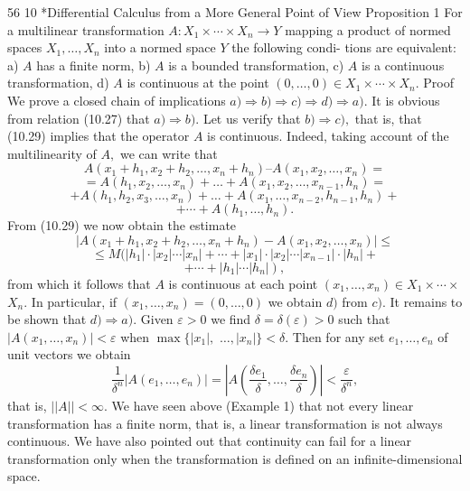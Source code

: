 56
10 *Differential Calculus from a More General Point of View
Proposition 1 For a multilinear transformation $A : X_1 \times \cdots \times X_n \to Y$ mapping a
product of normed spaces $X_1, \ldots, X_n$ into a normed space $Y$ the following condi-
tions are equivalent:
a) $A$ has a finite norm,
b) $A$ is a bounded transformation,
c) $A$ is a continuous transformation,
d) $A$ is continuous at the point $(0, \ldots, 0) \in X_1 \times \cdots \times X_n.$
Proof We prove a closed chain of implications $a) \Rightarrow b) \Rightarrow c) \Rightarrow d) \Rightarrow a).$
It is obvious from relation (10.27) that $a) \Rightarrow b).$
Let us verify that $b) \Rightarrow c),$ that is, that (10.29) implies that the operator $A$ is
continuous. Indeed, taking account of the multilinearity of $A,$ we can write that
$$A(x_1+ h_1, x_2 + h_2, \ldots, x_n + h_n) – A(x_1, x_2, \ldots, x_n) =$$
$$= A(h_1, x_2, \ldots, x_n) + \ldots + A(x_1, x_2, \ldots, x_{n-1}, h_n) =$$
$$+ A(h_1,h_2, x_3, \ldots, x_n) + \ldots + A(x_1,\ldots, x_{n-2}, h_{n-1}, h_n) +$$
$$+ \cdots +A(h_1,\ldots, h_n).$$
From (10.29) we now obtain the estimate
$$|A(x_1+ h_1, x_2 + h_2, \ldots, x_n + h_n) - A(x_1, x_2,\ldots,x_n) | \le$$
$$\le M(|h_1|\cdot|x_2|\cdots|x_n| + \cdots +|x_1|\cdot|x_2|\cdots |x_{n-1}|\cdot|h_n|+$$
$$\left. + \cdots + |h_1|\cdots |h_n| \right),$$
from which it follows that $A$ is continuous at each point $(x_1, \ldots, x_n) \in X_1 \times \cdots \times$
$X_n.$
In particular, if $(x_1, \ldots, x_n) = (0, \ldots, 0)$ we obtain $d)$ from $c).$
It remains to be shown that $d) \Rightarrow a).$
Given $\varepsilon > 0$ we find $\delta = \delta(\varepsilon) > 0$ such that $|A(x_1,\ldots,x_n)| < \varepsilon$ when $\max\{|x_1|,$
$\ldots, |x_n|\} < \delta.$ Then for any set $e_1, \ldots, e_n$ of unit vectors we obtain
$$\frac{1}{\delta^n} |A(e_1,\ldots, e_n)| = \left|A\left(\frac{\delta e_1}{\delta}, \ldots, \frac{\delta e_n}{\delta}\right)\right| < \frac{\varepsilon}{\delta^n},$$
that is, $||A|| < \infty.$
We have seen above (Example 1) that not every linear transformation has a finite
norm, that is, a linear transformation is not always continuous. We have also pointed
out that continuity can fail for a linear transformation only when the transformation
is defined on an infinite-dimensional space.